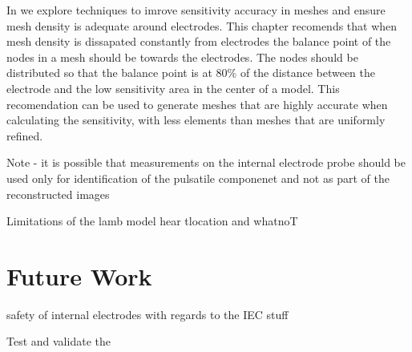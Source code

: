 In  we explore techniques to
imrove sensitivity accuracy in meshes and ensure mesh density is adequate 
around electrodes. This chapter recomends that 
when mesh density is dissapated constantly from electrodes 
the balance point 
of the nodes in a mesh should be towards the electrodes.
The nodes should be distributed so that the balance point is 
at 80\% of the distance between the electrode and the 
low sensitivity area in the center of a model.
This recomendation can be used to generate 
meshes that are highly accurate when calculating the sensitivity, with less elements
than meshes that are uniformly refined.  





Note - it is possible that measurements on the internal electrode probe 
should be used only for identification of the pulsatile componenet and not
as part of the reconstructed images

Limitations of the lamb model
hear tlocation and whatnoT

\section{Future Work}

safety of internal electrodes with regards to the IEC stuff

Test and validate the 